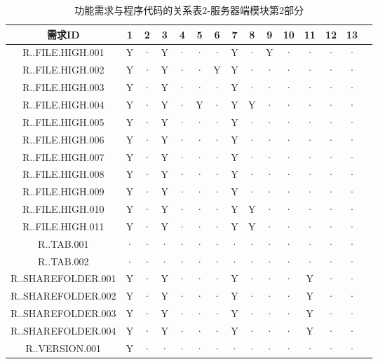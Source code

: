 {\begin{table}[htbp]
\begin{tabular}{|c|c|c|c|c|c|c|c|c|c|c|c|c|c|c|}
\end{tabular}
\end{table}

\begin{table}[htbp]
        \color{red}
\centering
\caption{功能需求与程序代码的关系表2-服务器端模块第2部分} \label{tab:requirement-module}
\begin{tabular}{|c|c|c|c|c|c|c|c|c|c|c|c|c|c|c|}
    \hline 
    需求ID & 1 & 2 & 3 & 4 & 5 & 6 & 7 & 8 & 9 & 10 & 11 & 12& 13\\    
    \hline 
    R..FILE.HIGH.001 &Y&· &Y&· &· &· &Y&· &Y&· &· &·&·\\
    \hline
    R..FILE.HIGH.002 &Y&· &Y&· &· &Y&Y&· &· &· &· &·&·\\
    \hline
    R..FILE.HIGH.003 &Y&· &Y&· &· &· &Y&· &· &· &· &·&·\\
    \hline
    R..FILE.HIGH.004 &Y&· &Y&· &Y&· &Y&Y&· &· &· &·&·\\
    \hline
    R..FILE.HIGH.005 &Y&· &Y&· &· &· &Y&· &· &· &· &·&·\\
    \hline
    R..FILE.HIGH.006 &Y&· &Y&· &· &· &Y&· &· &· &· &·&·\\
    \hline
    R..FILE.HIGH.007 &Y&· &Y&· &· &· &Y&· &· &· &· &·&·\\
    \hline 
    R..FILE.HIGH.008 &Y&· &Y&· &· &· &Y&· &· &· &· &·&·\\
    \hline
    R..FILE.HIGH.009 &Y&· &Y&· &· &· &Y&· &· &· &· &·&·\\
    \hline
    R..FILE.HIGH.010 &Y&· &Y&· &· &· &Y&Y&· &· &· &·&·\\
    \hline
    R..FILE.HIGH.011 &Y&· &Y&· &· &· &Y&Y&· &· &· &·&·\\
    \hline
    R..TAB.001 &· &· &· &· &· &· &· &· &· &· &· &·&·\\
    \hline 
    R..TAB.002 &· &· &· &· &· &· &· &· &· &· &· &·&·\\
    \hline
    R..SHAREFOLDER.001 &Y&· &Y&· &· &· &Y&· &· &· &Y&·&·\\
    \hline
    R..SHAREFOLDER.002 &Y&· &Y&· &· &· &Y&· &· &· &Y&·&·\\
    \hline
    R..SHAREFOLDER.003 &Y&· &Y&· &· &· &Y&· &· &· &Y&·&·\\ 
    \hline
    R..SHAREFOLDER.004 &Y&· &Y&· &· &· &Y&· &· &· &Y&·&·\\ 
    \hline
    R..VERSION.001 &Y&· &· &· &· &· &· &· &· &· &· &·&·\\
    \hline
    
\end{tabular}
\end{table}
} 